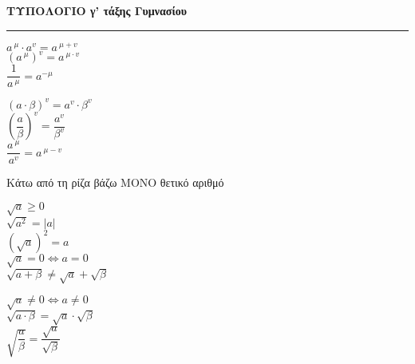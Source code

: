 \documentclass[a4paper,landscape,10pt]{article}
\begin{document}
\gr


\begin{center}
    \Large \textbf{ΤΥΠΟΛΟΓΙΟ γ' τάξης Γυμνασίου} \\
    \rule{.6\textwidth}{0.5pt}
\end{center}


\begin{multicols}{3}

\begin{minipage}{.3\linewidth}
\mybullet $a^{\ \mu} \cdot a^v=a^{\ \mu+v}$ \\
\mybullet $(a^{\ \mu})^v=a^{\ \mu\cdot v}$ \\
\mybullet $\dfrac{1}{a^{\ \mu}}=a^{-\mu}$ \\
\end{minipage}
\hfill\vline\hfill
\begin{minipage}{.3\linewidth}
\mybullet $(a\cdot\beta)^v=a^v\cdot \beta^v$ \\
\mybullet $\left(\dfrac{a}{\beta}\right)^v=\dfrac{a^v}{\beta^v}$ \\
\mybullet $\dfrac{a^{\ \mu}}{a^v}=a^{\ \mu-v}$ 
\end{minipage}



\mybullet Κάτω από τη ρίζα βάζω ΜΟΝΟ θετικό αριθμό \\
\begin{minipage}{.45\linewidth}
\mybullet $\sqrt{a}\ge0$ \\
\mybullet $\sqrt{a^2}=|a|$ \\
\mybullet $\left(\sqrt{a}\right)^2=a$ \\
\mybullet $\sqrt{a}=0\Leftrightarrow a=0$ \\
\mybullet $\sqrt{a+\beta}\ne\sqrt{a}+\sqrt{\beta}$
\end{minipage}\hfill\vline\hfill
\begin{minipage}{.45\linewidth}
\mybullet $\sqrt{a}\ne0\Leftrightarrow a\ne0$ \\
\mybullet $\sqrt{a\cdot\beta}=\sqrt{a}\cdot \sqrt{\beta}$ \\
\mybullet $\sqrt{\dfrac{a}{\beta}}=\dfrac{\sqrt{a}}{\sqrt{\beta}}$ 
\end{minipage} 



\end{multicols}
\end{document}
